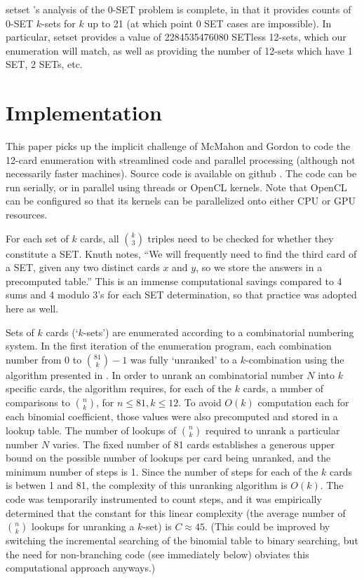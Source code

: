 \documentclass[10pt]{amsart}
\newcommand{\SETSET}{  {\sc setset} }
\begin{document}
\SETSET's analysis of the 0-SET problem is complete, in that it provides counts
of 0-SET $k$-sets for $k$ up to 21 (at which point 0 SET cases are impossible).
In particular, \SETSET provides a value of 2284535476080 SETless 12-sets, which
our enumeration will match, as well as providing the number of 12-sets which
have 1 SET, 2 SETs, etc.


\section{Implementation}
This paper picks up the implicit challenge of McMahon and Gordon to code the
12-card enumeration with streamlined code and parallel processing (although not
necessarily faster machines). Source code is available on github \cite{ME}. The
code can be run serially, or in parallel using threads or OpenCL \cite{OPENCL}
kernels. Note that OpenCL can be configured so that its kernels can be
parallelized onto either CPU or GPU resources.

For each set of $k$ cards, all $\binom{k}{3}$ triples need to be checked for
whether they constitute a SET. Knuth notes, ``We will frequently need to find
the third card of a SET, given any two distinct cards $x$ and $y$, so we store
the answers in a precomputed table.''  This is an immense computational savings
compared to 4 sums and 4 modulo 3's for each SET determination, so that practice
was adopted here as well.

Sets of $k$ cards (`$k$-sets') are enumerated according to a combinatorial
numbering system. In the first iteration of the enumeration program, each
combination number from 0 to $\binom{81}{k}-1$ was fully `unranked' to a
$k$-combination using the algorithm presented in \cite{WIKI}. In order to unrank
an combinatorial number $N$ into $k$ specific cards, the algorithm requires, for
each of the $k$ cards, a number of comparisons to $\binom{n}{k}$, for $n\le 81,
k\le 12$. To avoid $O(k)$ computation each for each binomial coefficient, those
values were also precomputed and stored in a lookup table. The number of lookups
of $\binom{n}{k}$ required to unrank a particular number $N$ varies. The fixed
number of 81 cards establishes a generous upper bound on the possible number of
lookups per card being unranked, and the minimum number of steps is 1. Since the
number of steps for each of the $k$ cards is betwen 1 and 81, the complexity of
this unranking algorithm is $O(k)$. The code was temporarily instrumented to
count steps, and it was empirically determined that the constant for this linear
complexity (the average number of $\binom{n}{k}$ lookups for unranking a
$k$-set) is $C\approx 45$. (This could be improved by switching the incremental
searching of the binomial table to binary searching, but the need for
non-branching code (see immediately below) obviates this computational approach
anyways.)
\end{document}
